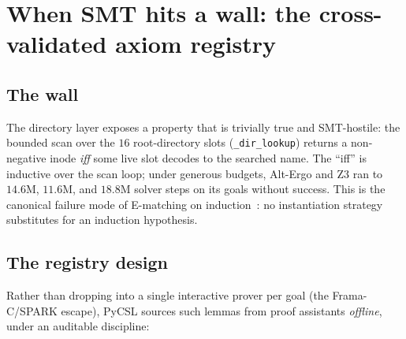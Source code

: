 \documentclass[11pt]{article}
\newcommand{\pycsl}{\textsf{PyCSL}}
\newcommand{\altergo}{\textsf{Alt-Ergo}}
\newcommand{\zthree}{\textsf{Z3}}
\begin{document}
\section{When SMT hits a wall: the cross-validated axiom registry}
\label{sec:axioms}

\subsection{The wall}

The directory layer exposes a property that is trivially true and
SMT-hostile: the bounded scan over the $16$ root-directory slots
(\texttt{\_dir\_lookup}) returns a non-negative inode \emph{iff} some live
slot decodes to the searched name. The ``iff'' is inductive over the scan
loop; under generous budgets, \altergo{} and \zthree{} ran to
$14.6\mathrm{M}$, $11.6\mathrm{M}$, and $18.8\mathrm{M}$ solver steps on its
goals without success. This is the canonical failure mode of E-matching on
induction~\cite{simplify}: no instantiation strategy substitutes for an
induction hypothesis.

\subsection{The registry design}

Rather than dropping into a single interactive prover per goal (the
Frama-C/SPARK escape), \pycsl{} sources such lemmas from proof assistants
\emph{offline}, under an auditable discipline:
\end{document}
